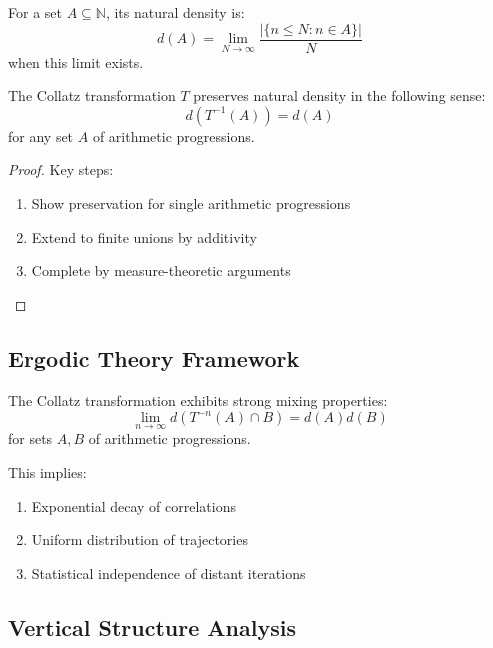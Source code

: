\begin{definition}
For a set $A \subseteq \mathbb{N}$, its natural density is:
\[
d(A) = \lim_{N \to \infty} \frac{|\{n \leq N : n \in A\}|}{N}
\]
when this limit exists.
\end{definition}

\begin{theorem}
The Collatz transformation $T$ preserves natural density in the following sense:
\[
d(T^{-1}(A)) = d(A)
\]
for any set $A$ of arithmetic progressions.
\end{theorem}

\begin{proof}
Key steps:
\begin{enumerate}
\item Show preservation for single arithmetic progressions
\item Extend to finite unions by additivity
\item Complete by measure-theoretic arguments
\end{enumerate}
\end{proof}

\subsection{Ergodic Theory Framework}

\begin{theorem}\label{thm:strong_mixing}
The Collatz transformation exhibits strong mixing properties:
\[
\lim_{n \to \infty} d(T^{-n}(A) \cap B) = d(A)d(B)
\]
for sets $A, B$ of arithmetic progressions.
\end{theorem}

This implies:
\begin{enumerate}
\item Exponential decay of correlations
\item Uniform distribution of trajectories
\item Statistical independence of distant iterations
\end{enumerate}

\subsection{Vertical Structure Analysis}

